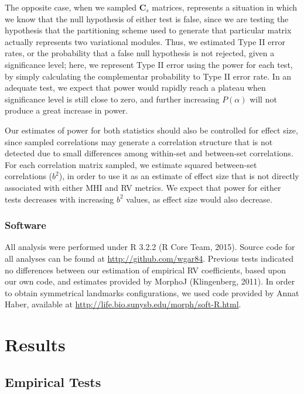 \documentclass[12pt,twoside]{report}
\begin{document}
The opposite case, when we sampled $\mathbf{C}_s$ matrices, represents a
situation in which we know that the null hypothesis of either test is
false, since we are testing the hypothesis that the partitioning scheme
used to generate that particular matrix actually represents two
variational modules. Thus, we estimated Type II error rates, or the
probability that a false null hypothesis is not rejected, given a
significance level; here, we represent Type II error using the power for
each test, by simply calculating the complementar probability to Type II
error rate. In an adequate test, we expect that power would rapidly
reach a plateau when significance level is still close to zero, and
further increasing $P(\alpha)$ will not produce a great increase in
power.

Our estimates of power for both statistics should also be controlled for
effect size, since sampled correlations may generate a correlation
structure that is not detected due to small differences among within-set
and between-set correlations. For each correlation matrix sampled, we
estimate squared between-set correlations ($b^2$), in order to use it as
an estimate of effect size that is not directly associated with either
MHI and RV metrics. We expect that power for either tests decreases with
increasing $b^2$ values, as effect size would also decrease.

\subsubsection{Software}\label{software}

All analysis were performed under R 3.2.2 (R Core Team, 2015). Source
code for all analyses can be found at \url{http://github.com/wgar84}.
Previous tests indicated no differences between our estimation of
empirical RV coefficients, based upon our own code, and estimates
provided by MorphoJ (Klingenberg, 2011). In order to obtain symmetrical
landmarks configurations, we used code provided by Annat Haber,
available at \url{http://life.bio.sunysb.edu/morph/soft-R.html}.

\section{Results}\label{results}

\subsection{Empirical Tests}\label{empirical-tests-1}
\end{document}

